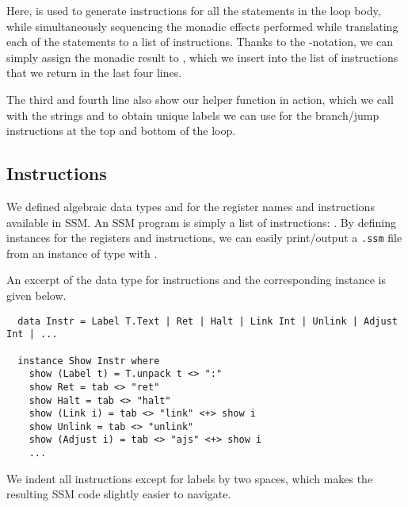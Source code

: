 Here,  is used to generate instructions for
all the statements in the loop body, while simultaneously sequencing the monadic
effects performed while translating each of the statements to a list of
instructions. Thanks to the -notation, we can simply assign the
monadic result to , which we insert into the list of
instructions that we return in the last four lines.

The third and fourth line also show our  helper function in
action, which we call with the strings  and 
to obtain unique labels we can use for the branch/jump instructions at the
top and bottom of the  loop.



\subsection{Instructions} \label{sec:codegen-instructions}

We defined algebraic data types  and  for the
register names and instructions available in SSM. An SSM program is simply a
list of instructions: .
By defining  instances for the registers and instructions, we can
easily print/output a \verb|.ssm| file from an instance of type
\haskell{[Instr]} with .

An excerpt of the data type for instructions and the corresponding 
instance is given below.

\begin{verbatim}
  data Instr = Label T.Text | Ret | Halt | Link Int | Unlink | Adjust Int | ...

  instance Show Instr where
    show (Label t) = T.unpack t <> ":"
    show Ret = tab <> "ret"
    show Halt = tab <> "halt"
    show (Link i) = tab <> "link" <+> show i
    show Unlink = tab <> "unlink"
    show (Adjust i) = tab <> "ajs" <+> show i
    ...
\end{verbatim}

We indent all instructions except for labels by two spaces, which makes the
resulting SSM code slightly easier to navigate.


